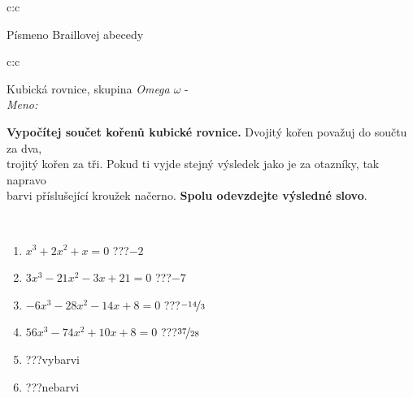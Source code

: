 \documentclass[10pt]{report}
\begin{document}
\begin{tabular}{c:c}
\begin{minipage}[c][104.5mm][t]{0.5\linewidth}
\begin{center}
\begin{minipage}{0.20\linewidth}
\begin{center}
{\small Písmeno Braillovej abecedy}
\end{center}
\end{minipage}
\end{center}
\end{minipage}
%
\end{tabular}
\newpage
\thispagestyle{empty}
\begin{tabular}{c:c}
\begin{minipage}[c][104.5mm][t]{0.5\linewidth}
\begin{center}
\vspace{7mm}
{\huge Kubická rovnice, skupina \textit{Omega $\omega$} -}\\[5mm]
\textit{Meno:}\phantom{xxxxxxxxxxxxxxxxxxxxxxxxxxxxxxxxxxxxxxxxxxxxxxxxxxxxxxxxxxxxxxxxx}\\[5mm]
\begin{minipage}{0.95\linewidth}
\textbf{Vypočítej součet kořenů kubické rovnice.} Dvojitý kořen považuj do součtu za dva,\\trojitý kořen za tři. Pokud ti vyjde stejný výsledek jako je za otazníky, tak napravo\\barvi příslušející kroužek načerno. \textbf{Spolu odevzdejte výsledné slovo}.
\end{minipage}
\\[1mm]
\begin{minipage}{0.79\linewidth}
\begin{center}
\begin{varwidth}{\linewidth}
\begin{enumerate}
\Large
\item $x^3+2x^2+x=0$\quad \dotfill\; ???\;\dotfill \quad $-2$
\item $3x^3-21x^2-3x+21=0$\quad \dotfill\; ???\;\dotfill \quad $-7$
\item $-6x^3-28x^2-14x+8=0$\quad \dotfill\; ???\;\dotfill \quad $\nicefrac{-14}{3}$
\item $56x^3-74x^2+10x+8=0$\quad \dotfill\; ???\;\dotfill \quad $\nicefrac{37}{28}$
\item \quad \dotfill\; ???\;\dotfill \quad vybarvi
\item \quad \dotfill\; ???\;\dotfill \quad nebarvi
\end{enumerate}
\end{varwidth}
\end{center}
\end{minipage}
\begin{minipage}{0.20\linewidth}
\begin{center}

\end{center}
\end{minipage}
\end{center}
\end{minipage}
\end{tabular}
\end{document}
